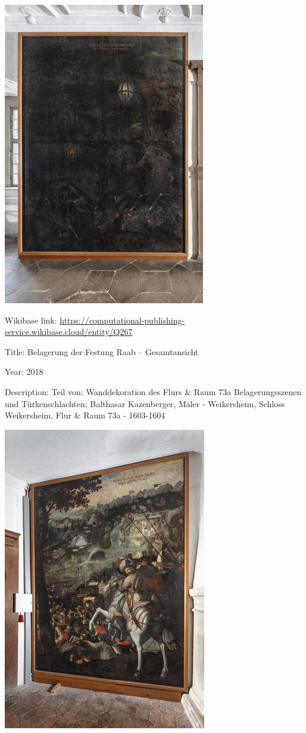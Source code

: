 \documentclass[
  letterpaper,
]{book}
\begin{document}
\includegraphics{paintings_files/figure-pdf/cell-3-output-24.png}

Wikibase link:
\url{https://computational-publishing-service.wikibase.cloud/entity/Q267}

Title: Belagerung der Festung Raab -- Gesamtansicht

Year: 2018

Description: Teil von: Wanddekoration des Flurs \& Raum 73a
Belagerungsszenen und Türkenschlachten; Balthasar Kazenberger, Maler -
Weikersheim, Schloss Weikersheim, Flur \& Raum 73a - 1603-1604

\includegraphics{paintings_files/figure-pdf/cell-3-output-26.png}
\end{document}
